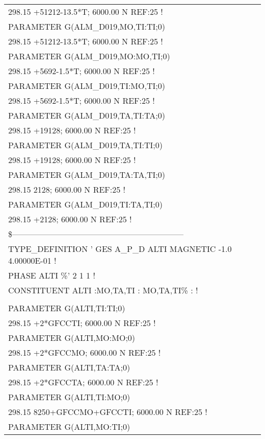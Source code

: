 \begin{longtable}[H]{ l l l }
	\multicolumn{3}{l}{298.15 +51212-13.5*T; 6000.00 N REF:25 !}\\
	PARAMETER G(ALM\_D019,MO,TI:TI;0) & & \\
	\multicolumn{3}{l}{298.15 +51212-13.5*T; 6000.00 N REF:25 !}\\
	PARAMETER G(ALM\_D019,MO:MO,TI;0) & & \\
	\multicolumn{3}{l}{298.15 +5692-1.5*T; 6000.00 N REF:25 !}\\
	PARAMETER G(ALM\_D019,TI:MO,TI;0) & & \\
	\multicolumn{3}{l}{298.15 +5692-1.5*T; 6000.00 N REF:25 !}\\	 
	PARAMETER G(ALM\_D019,TA,TI:TA;0) & & \\
	\multicolumn{3}{l}{298.15 +19128; 6000.00 N REF:25 !}\\
	PARAMETER G(ALM\_D019,TA,TI:TI;0) & & \\
	\multicolumn{3}{l}{298.15 +19128; 6000.00 N REF:25 !}\\	 
	PARAMETER G(ALM\_D019,TA:TA,TI;0) & & \\
	\multicolumn{3}{l}{298.15 2128; 6000.00 N REF:25 !}\\
	PARAMETER G(ALM\_D019,TI:TA,TI;0) & & \\ 
	\multicolumn{3}{l}{298.15 +2128; 6000.00 N REF:25 !}\\
	\multicolumn{3}{l}{\$---------------------------------------------------------------}\\
	\multicolumn{3}{l}{TYPE\_DEFINITION ' GES A\_P\_D ALTI MAGNETIC  -1.0    4.00000E-01 !}\\
	\multicolumn{3}{l}{PHASE ALTI  \%'  2 1   1 !}\\
	\multicolumn{3}{l}{CONSTITUENT ALTI  :MO,TA,TI : MO,TA,TI\% :  !}\\
	& & \\
	PARAMETER G(ALTI,TI:TI;0) & & \\
	\multicolumn{3}{l}{298.15 +2*GFCCTI; 6000.00 N REF:25 !}\\	
	PARAMETER G(ALTI,MO:MO;0) & & \\
	\multicolumn{3}{l}{298.15 +2*GFCCMO; 6000.00 N REF:25 !}\\ 
	PARAMETER G(ALTI,TA:TA;0) & & \\
	\multicolumn{3}{l}{298.15 +2*GFCCTA; 6000.00 N REF:25 !}\\
	PARAMETER G(ALTI,TI:MO;0) & & \\
	\multicolumn{3}{l}{298.15 8250+GFCCMO+GFCCTI; 6000.00 N REF:25  !}\\	 
	PARAMETER G(ALTI,MO:TI;0) & & \\

\end{longtable}
